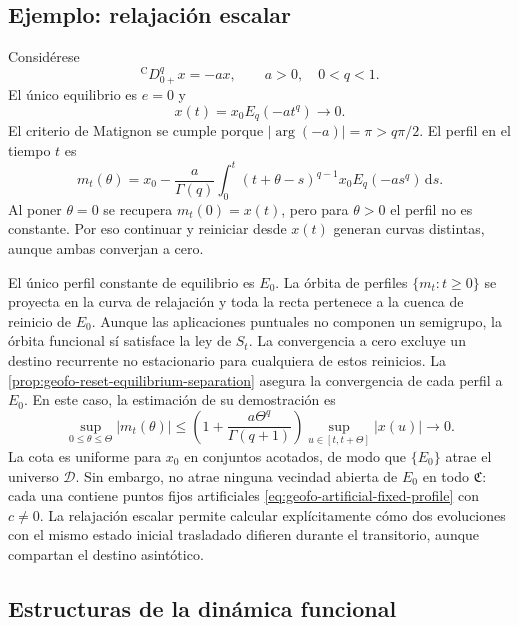 \subsection{Ejemplo: relajación escalar}

Considérese
\begin{equation}
 {}^{\mathrm C}D_{0+}^{q}x=-a x,
 \qquad a>0,\quad 0<q<1.
 \label{eq:geofo-relaxation}
\end{equation}
El único equilibrio es \(e=0\) y
\begin{equation}
 x(t)=x_0E_q(-at^q)\longrightarrow0.
 \label{eq:geofo-relaxation-solution}
\end{equation}
El criterio de Matignon se cumple porque
\(|\arg(-a)|=\pi>q\pi/2\). El perfil en el tiempo \(t\) es
\begin{equation}
 m_t(\theta)=x_0-
 \frac a{\Gamma(q)}\int_0^t
 (t+\theta-s)^{q-1}x_0E_q(-as^q)\,\mathrm ds.
 \label{eq:geofo-relaxation-profile}
\end{equation}
Al poner \(\theta=0\) se recupera \(m_t(0)=x(t)\), pero para
\(\theta>0\) el perfil no es constante. Por eso continuar y reiniciar desde
\(x(t)\) generan curvas distintas, aunque ambas converjan a cero.

El único perfil constante de equilibrio es \(E_0\). La órbita de perfiles
\(\{m_t:t\ge0\}\) se proyecta en la curva de relajación y toda la recta
pertenece a la cuenca de reinicio de \(E_0\). Aunque las aplicaciones
puntuales no componen un semigrupo, la órbita funcional sí satisface la ley
de \(S_t\). La convergencia a cero excluye un destino recurrente no
estacionario para cualquiera de estos reinicios.
La \cref{prop:geofo-reset-equilibrium-separation} asegura la convergencia
de cada perfil a \(E_0\). En este caso, la estimación de su demostración es
\[
 \sup_{0\leq\theta\leq\Theta}|m_t(\theta)|
 \leq\left(1+\frac{a\Theta^q}{\Gamma(q+1)}\right)
       \sup_{u\in[t,t+\Theta]}|x(u)|\longrightarrow0.
\]
La cota es uniforme para \(x_0\) en conjuntos acotados, de modo que
\(\{E_0\}\) atrae el universo \(\mathcal D\). Sin embargo, no atrae
ninguna vecindad abierta de \(E_0\) en todo \(\mathfrak C\): cada una
contiene puntos fijos artificiales
\cref{eq:geofo-artificial-fixed-profile} con \(c\ne0\).
La relajación escalar permite calcular explícitamente cómo dos evoluciones
con el mismo estado inicial trasladado difieren durante el transitorio,
aunque compartan el destino asintótico.

\subsection{Estructuras de la dinámica funcional}

